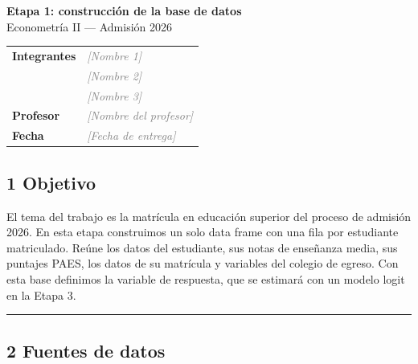 \documentclass[11pt,letterpaper]{article}
\newcommand{\completar}[1]{\textcolor{gray}{\textit{[#1]}}}
\begin{document}
\sloppy

\begin{center}
  {\LARGE \textbf{Etapa 1: construcción de la base de datos}}\\[4pt]
  {\large Econometría II --- Admisión 2026}
\end{center}
\vspace{0.5em}

\begin{center}
\begin{tabular}{ll}
\toprule
\textbf{Integrantes} & \completar{Nombre 1} \\
                     & \completar{Nombre 2} \\
                     & \completar{Nombre 3} \\
\midrule
\textbf{Profesor}    & \completar{Nombre del profesor} \\
\textbf{Fecha}       & \completar{Fecha de entrega} \\
\bottomrule
\end{tabular}
\end{center}

\bigskip

\subsection*{1 \; Objetivo}

El tema del trabajo es la matrícula en educación superior del proceso de
admisión 2026. En esta etapa construimos un solo data frame con una fila
por estudiante matriculado. Reúne los datos del estudiante, sus notas de
enseñanza media, sus puntajes PAES, los datos de su matrícula y variables
del colegio de egreso. Con esta base definimos la variable de respuesta,
que se estimará con un modelo logit en la Etapa 3.

\medskip\hrule\medskip

\subsection*{2 \; Fuentes de datos}
\end{document}
